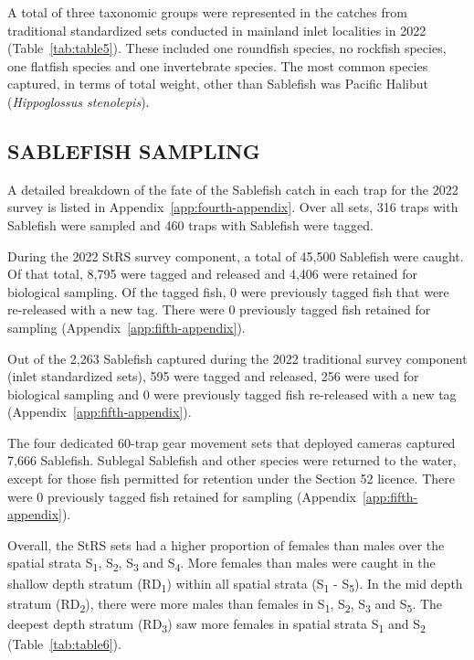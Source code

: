 \documentclass[12pt]{article}\usepackage[]{graphicx}\usepackage[]{color}
\begin{document}
A total of three taxonomic groups were represented in the catches from traditional standardized sets conducted in mainland inlet localities in 2022 (Table~\ref{tab:table5}). These included one roundfish species, no rockfish species, one flatfish species and one invertebrate species. The most common species captured, in terms of total weight, other than Sablefish was Pacific Halibut (\emph{Hippoglossus stenolepis}).

\hypertarget{sablefish-sampling}{%
\subsection{SABLEFISH SAMPLING}\label{sablefish-sampling}}

A detailed breakdown of the fate of the Sablefish catch in each trap for the 2022 survey is listed in Appendix~\ref{app:fourth-appendix}. Over all sets, 316 traps with Sablefish were sampled and 460 traps with Sablefish were tagged.

During the 2022 StRS survey component, a total of 45,500 Sablefish were caught. Of that total, 8,795 were tagged and released and 4,406 were retained for biological sampling. Of the tagged fish, 0 were previously tagged fish that were re-released with a new tag. There were 0 previously tagged fish retained for sampling (Appendix~\ref{app:fifth-appendix}).

Out of the 2,263 Sablefish captured during the 2022 traditional survey component (inlet standardized sets), 595 were tagged and released, 256 were used for biological sampling and 0 were previously tagged fish re-released with a new tag (Appendix~\ref{app:fifth-appendix}).

The four dedicated 60-trap gear movement sets that deployed cameras captured 7,666 Sablefish. Sublegal Sablefish and other species were returned to the water, except for those fish permitted for retention under the Section 52 licence. There were 0 previously tagged fish retained for sampling (Appendix~\ref{app:fifth-appendix}).

Overall, the StRS sets had a higher proportion of females than males over the spatial strata S\textsubscript{1}, S\textsubscript{2}, S\textsubscript{3} and S\textsubscript{4}. More females than males were caught in the shallow depth stratum (RD\textsubscript{1}) within all spatial strata (S\textsubscript{1} - S\textsubscript{5}). In the mid depth stratum (RD\textsubscript{2}), there were more males than females in S\textsubscript{1}, S\textsubscript{2}, S\textsubscript{3} and S\textsubscript{5}. The deepest depth stratum (RD\textsubscript{3}) saw more females in spatial strata S\textsubscript{1} and S\textsubscript{2} (Table~\ref{tab:table6}).
\end{document}
